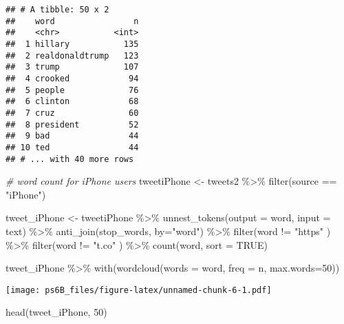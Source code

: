\documentclass[
]{article}
\newenvironment{Shaded}{\begin{snugshade}}{\end{snugshade}}
\newcommand{\AttributeTok}[1]{\textcolor[rgb]{0.77,0.63,0.00}{#1}}
\newcommand{\CommentTok}[1]{\textcolor[rgb]{0.56,0.35,0.01}{\textit{#1}}}
\newcommand{\ConstantTok}[1]{\textcolor[rgb]{0.00,0.00,0.00}{#1}}
\newcommand{\DecValTok}[1]{\textcolor[rgb]{0.00,0.00,0.81}{#1}}
\newcommand{\FunctionTok}[1]{\textcolor[rgb]{0.00,0.00,0.00}{#1}}
\newcommand{\NormalTok}[1]{#1}
\newcommand{\OtherTok}[1]{\textcolor[rgb]{0.56,0.35,0.01}{#1}}
\newcommand{\SpecialCharTok}[1]{\textcolor[rgb]{0.00,0.00,0.00}{#1}}
\newcommand{\StringTok}[1]{\textcolor[rgb]{0.31,0.60,0.02}{#1}}
\begin{document}
\begin{verbatim}
## # A tibble: 50 x 2
##    word                n
##    <chr>           <int>
##  1 hillary           135
##  2 realdonaldtrump   123
##  3 trump             107
##  4 crooked            94
##  5 people             76
##  6 clinton            68
##  7 cruz               60
##  8 president          52
##  9 bad                44
## 10 ted                44
## # ... with 40 more rows
\end{verbatim}

\begin{Shaded}
\begin{Highlighting}[]
\CommentTok{\# word count for iPhone users}
\NormalTok{tweetiPhone }\OtherTok{\textless{}{-}}\NormalTok{ tweets2 }\SpecialCharTok{\%\textgreater{}\%}
  \FunctionTok{filter}\NormalTok{(source }\SpecialCharTok{==} \StringTok{"iPhone"}\NormalTok{)}

\NormalTok{tweet\_iPhone }\OtherTok{\textless{}{-}}\NormalTok{ tweetiPhone }\SpecialCharTok{\%\textgreater{}\%}
  \FunctionTok{unnest\_tokens}\NormalTok{(}\AttributeTok{output =}\NormalTok{ word, }\AttributeTok{input =}\NormalTok{ text) }\SpecialCharTok{\%\textgreater{}\%}
  \FunctionTok{anti\_join}\NormalTok{(stop\_words, }\AttributeTok{by=}\StringTok{"word"}\NormalTok{) }\SpecialCharTok{\%\textgreater{}\%}
  \FunctionTok{filter}\NormalTok{(word }\SpecialCharTok{!=} \StringTok{"https"}\NormalTok{ ) }\SpecialCharTok{\%\textgreater{}\%}
  \FunctionTok{filter}\NormalTok{(word }\SpecialCharTok{!=} \StringTok{"t.co"}\NormalTok{ ) }\SpecialCharTok{\%\textgreater{}\%}
  \FunctionTok{count}\NormalTok{(word, }\AttributeTok{sort =} \ConstantTok{TRUE}\NormalTok{)}

\NormalTok{tweet\_iPhone }\SpecialCharTok{\%\textgreater{}\%}
  \FunctionTok{with}\NormalTok{(}\FunctionTok{wordcloud}\NormalTok{(}\AttributeTok{words =}\NormalTok{ word, }\AttributeTok{freq =}\NormalTok{ n, }\AttributeTok{max.words=}\DecValTok{50}\NormalTok{))}
\end{Highlighting}
\end{Shaded}

\texttt{[image: ps6B\_files/figure-latex/unnamed-chunk-6-1.pdf]}

\begin{Shaded}
\begin{Highlighting}[]
\FunctionTok{head}\NormalTok{(tweet\_iPhone, }\DecValTok{50}\NormalTok{)}
\end{Highlighting}
\end{Shaded}
\end{document}
